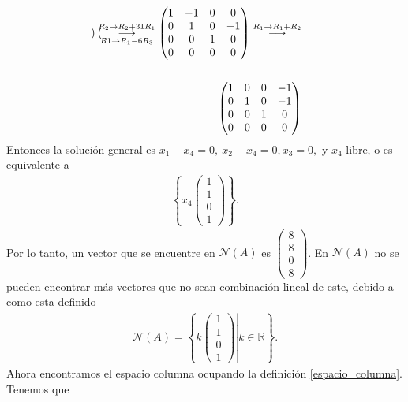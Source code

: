 \documentclass[11pt,letterpaper]{article}
\newcommand{\mR}{\mathbb{R}}
\newcommand{\grstep}[2][\relax]{%
   \ensuremath{\mathrel{
       {\mathop{\longrightarrow}\limits^{#2\mathstrut}_{
                                     \begin{subarray}{l} #1 \end{subarray}}}}}}
\begin{document}
\begin{enumerate}
\begin{align*}
\begin{pmatrix}
\end{pmatrix}%
\grstep[R1 \rightarrow R_1-6R_3]{R_2 \rightarrow R_2+31R_1}
%
\begin{pmatrix}
 1 & -1 &  0 & 0\\
 0 &  1 &  0 &-1\\
 0 &  0 &  1 & 0\\
 0 &  0 &  0 & 0
\end{pmatrix}%
\grstep[]{R_1 \rightarrow R_1+R_2}\\ \\
\begin{pmatrix}
 1 &  0 &  0 & -1\\
 0 &  1 &  0 &-1\\
 0 &  0 &  1 & 0\\
 0 &  0 &  0 & 0
\end{pmatrix}&
\end{align*}
Entonces la solución general es $x_1-x_4=0, \ x_2-x_4=0, x_3=0,$ y $x_4$ libre, o es equivalente a 
\begin{align*}
\left\{x_4 \begin{pmatrix}
1\\
1\\
0\\
1
\end{pmatrix} \right\}.
\end{align*}
Por lo tanto, un vector que se encuentre en $\mathcal{N}(A)$ es $\begin{pmatrix}
8\\
8\\
0\\
8
\end{pmatrix}$. En $\mathcal{N}(A)$ no se pueden encontrar más vectores que no sean combinación lineal de este, debido a  como esta definido 
\begin{align*}
\mathcal{N}(A)=\left\{k \left. \begin{pmatrix}
1\\
1\\
0\\
1
\end{pmatrix}\right| k\in \mR \right\}.
\end{align*}
Ahora encontramos el espacio columna ocupando la definición \ref{espacio_columna}. Tenemos que 


\end{enumerate}
\end{document}
